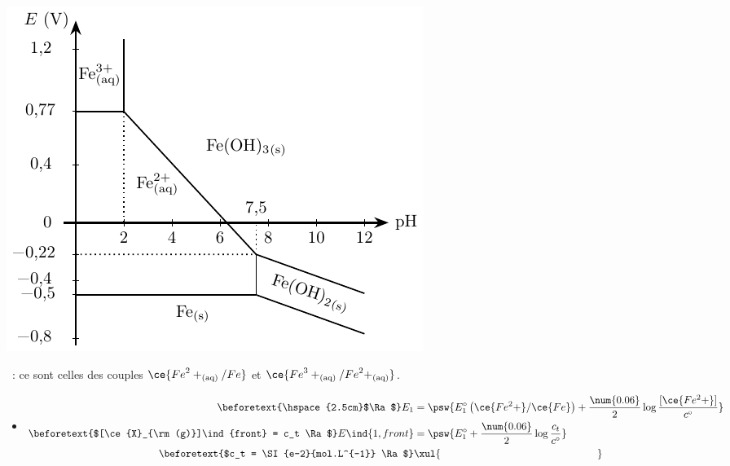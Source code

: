 \documentclass[../../main/main.tex]{subfiles}
\begin{document}
\begin{tcb*}[breakable]
\begin{minipage}[c]{.30\linewidth}
\begin{center}
{        \includegraphics[width=1.1\linewidth]{eph_fer}
      }
    \end{center}
  \end{minipage}
  \tcblower
  \begin{enumerate}[label=\sqenumi]
    ~: ce sont celles des couples
    $\ce{{Fe}^2+_{\rm(aq)}/Fe}$ et $\ce{{Fe}^3+_{\rm(aq)}/{Fe}^2+_{\rm(aq)}}$.
    \begin{itemize}
      \item
            \vspace{-15pt}
              \begin{align*}
                \beforetext{\hspace{2.5cm}$\Ra$}
                E_1
                &=
                \psw{%
                  E_1^\circ \left( \ce{Fe^2+}/\ce{Fe} \right) +
                  \frac{\num{0.06}}{2} \log \frac{[\ce{Fe^2+}]}{c^\circ}
                }%
                \\
                \beforetext{$[\ce{X}_{\rm(g)}]\ind{front} = c_t \Ra $}
                E\ind{1,front} &=
                \psw{E_1^\circ + \frac{\num{0.06}}{2}\log \frac{c_t}{c^\circ}}
                \\
                \beforetext{$c_t = \SI{e-2}{mol.L^{-1}} \Ra$}
                \makebox[0pt][l]{$\xul{\phantom{E\ind{1,front} = - \SI{0.5}{V}}}$}

\end{align*}
\end{itemize}
\end{enumerate}
\end{tcb*}
\end{document}
